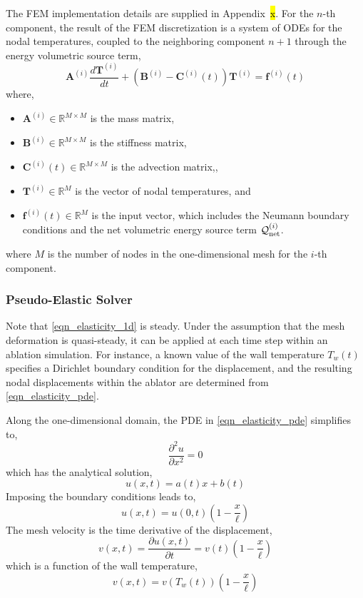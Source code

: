 The FEM implementation details are supplied in Appendix~\hl{x}. For the $n$-th component, the result of the FEM discretization is a system of ODEs for the nodal temperatures, coupled to the neighboring component $n+1$ through the energy volumetric source term,
\begin{equation}
    \mathbf{A}^{(i)}\frac{d\mathbf{T}^{(i)}}{dt} + \left(\mathbf{B}^{(i)} - \mathbf{C}^{(i)}(t)\right)\mathbf{T}^{(i)} = \mathbf{f}^{(i)}(t)
\end{equation}
where,
\begin{itemize}
    \item $\mathbf{A}^{(i)}\in\mathbb{R}^{M\times M}$ is the mass matrix,
    \item $\mathbf{B}^{(i)}\in\mathbb{R}^{M\times M}$ is the stiffness matrix,
    \item $\mathbf{C}^{(i)}(t)\in\mathbb{R}^{M\times M}$ is the advection matrix,,
    \item $\mathbf{T}^{(i)}\in\mathbb{R}^{M}$ is the vector of nodal temperatures, and
    \item $\mathbf{f}^{(i)}(t)\in\mathbb{R}^{M}$ is the input vector, which includes the Neumann boundary conditions and the net volumetric energy source term $\mathcal{Q}^{(i)}_{\text{net}}$.
\end{itemize}
where $M$ is the number of nodes in the one-dimensional mesh for the $i$-th component.

\subsubsection{Pseudo-Elastic Solver}

Note that \cref{eqn_elasticity_1d} is steady. Under the assumption that the mesh deformation is quasi-steady, it can be applied at each time step within an ablation simulation. For instance, a known value of the wall temperature $T_w(t)$ specifies a Dirichlet boundary condition for the displacement, and the resulting nodal displacements within the ablator are determined from \cref{eqn_elasticity_pde}.

Along the one-dimensional domain, the PDE in \cref{eqn_elasticity_pde} simplifies to,
\begin{equation}
    \frac{\partial^2 u}{\partial x^2} = 0
\end{equation}
which has the analytical solution,
\begin{equation}
    u(x,t) = a(t)x + b(t)
\end{equation}
Imposing the boundary conditions leads to,
\begin{equation}
    u(x,t) = u(0,t)\left(1 - \frac{x}{\ell}\right)
\end{equation}
The mesh velocity is the time derivative of the displacement,
\begin{equation}
    v(x,t) = \frac{\partial u(x,t)}{\partial t} = v(t)\left(1 - \frac{x}{\ell}\right)
\end{equation}
which is a function of the wall temperature,
\begin{equation}
    v(x,t) = v(T_w(t)) \left(1 - \frac{x}{\ell}\right)
\end{equation}

